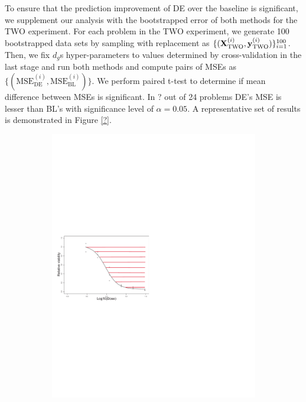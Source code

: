 To ensure that the prediction improvement of DE over the baseline is significant, we supplement our analysis with the bootstrapped error of both methods for the TWO experiment.
For each problem in the TWO experiment, we generate 100 bootstrapped data sets by sampling with replacement as $\{(\mathbf{X}^{(i)}_{\text{TWO}}, \mathbf{y}^{(i)}_{\text{TWO}})\}_{i=1}^{100}$.  
Then, we fix $d_g$s hyper-parameters to values determined by cross-validation in the last stage and run both methods and compute pairs of MSEs as $\{(\text{MSE}^{(i)}_{\text{DE}}, \text{MSE}^{(i)}_{\text{BL}})\}$. We perform paired t-test to determine if mean difference between MSEs is significant. In ? out of 24 problems DE's MSE is lesser than BL's with significance level of $\alpha = 0.05$. A representative set of results is demonstrated in Figure \ref{?}. 

	\begin{figure}
	\begin{subfigure}[b]{0.32\textwidth}
		\includegraphics[width=\textwidth]{./img/dr4.pdf}
		\caption{}\label{fig:dr}

\end{subfigure}
\end{figure}
